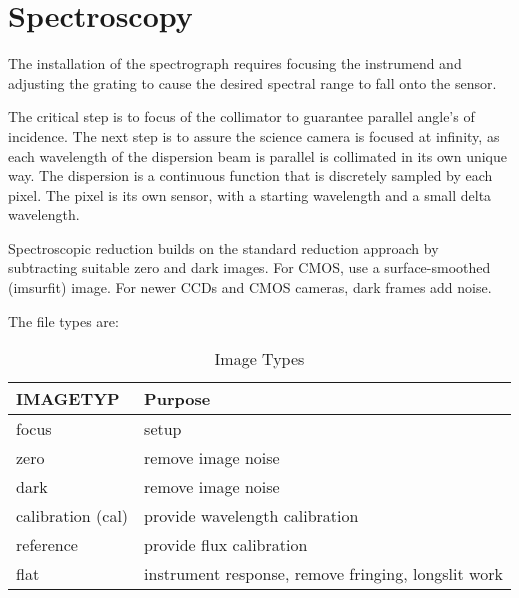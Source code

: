 \section{Spectroscopy}

The installation of the spectrograph requires focusing the instrumend
and adjusting the grating to cause the desired spectral range to fall 
onto the sensor.

The critical step is to focus of the collimator to guarantee parallel
angle's of incidence. The next step is to assure the science camera
is focused at infinity, as each wavelength of the dispersion beam
is parallel is collimated in its own unique way. The dispersion is
a continuous function that is discretely sampled by each pixel. The
pixel is its own sensor, with a starting wavelength and a small delta
wavelength. 

Spectroscopic reduction builds on the standard reduction approach by
subtracting suitable zero and dark images. For CMOS, use a
surface-smoothed (imsurfit)  image. For newer
CCDs and CMOS cameras, dark frames add noise.

The file types are:

\begin{table}[h!]
\centering
\begin{tabular}{| l | l |}
\hline
IMAGETYP  & Purpose   \\
\hline
focus             & setup    \\ 
zero              & remove image noise    \\ 
dark              & remove image noise    \\ 
calibration (cal) & provide wavelength calibration    \\ 
reference         & provide flux calibration    \\ 
flat              & instrument response, remove fringing, longslit work    \\ 
\hline
\end{tabular}
\caption[TOC]{Image Types}
\label{table:ImageTypes}
\end{table}

